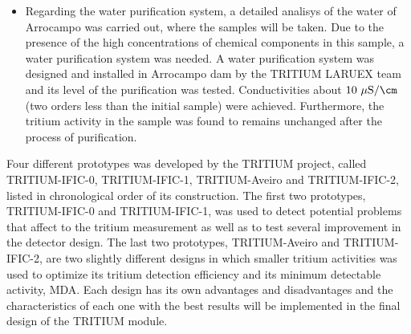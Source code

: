 \begin{itemize}
\item{} Regarding the water purification system, a detailed analisys of the water of Arrocampo was carried out, where the samples will be taken. Due to the presence of the high concentrations of chemical components in this sample, a water purification system was needed. A water purification system was designed and installed in Arrocampo dam by the TRITIUM LARUEX team and its level of the purification was tested. Conductivities about $10~\mu\text{S}/\cm$ (two orders less than the initial sample) were achieved. Furthermore, the tritium activity in the sample was found to remains unchanged after the process of purification.

\end{itemize}


Four different prototypes was developed by the TRITIUM project, called TRITIUM-IFIC-0, TRITIUM-IFIC-1, TRITIUM-Aveiro and TRITIUM-IFIC-2, listed in chronological order of its construction. The first two prototypes, TRITIUM-IFIC-0 and TRITIUM-IFIC-1, was used to detect potential problems that affect to the tritium measurement as well as to test several improvement in the detector design. The last two prototypes, TRITIUM-Aveiro and TRITIUM-IFIC-2, are two slightly different designs in which smaller tritium activities was used to optimize its tritium detection efficiency and its minimum detectable activity, MDA. Each design has its own advantages and disadvantages and the characteristics of each one with the best results will be implemented in the final design of the TRITIUM module.

